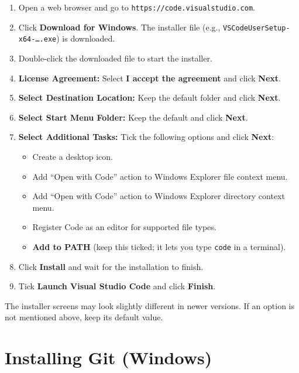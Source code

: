 \documentclass[11pt,a4paper]{article}
\newcommand{\code}[1]{\texttt{#1}}
\newcommand{\menu}[1]{\textsf{\textbf{#1}}}
\begin{document}
\begin{enumerate}
\item Open a web browser and go to \code{https://code.visualstudio.com}.
\item Click \menu{Download for Windows}. The installer file (e.g., \code{VSCodeUserSetup-x64-\ldots.exe}) is downloaded.
\item Double-click the downloaded file to start the installer.
\item \textbf{License Agreement:} Select \menu{I accept the agreement} and click \menu{Next}.
\item \textbf{Select Destination Location:} Keep the default folder and click \menu{Next}.
\item \textbf{Select Start Menu Folder:} Keep the default and click \menu{Next}.
\item \textbf{Select Additional Tasks:} Tick the following options and click \menu{Next}:
  \begin{itemize}
  \item Create a desktop icon.
  \item Add ``Open with Code'' action to Windows Explorer file context menu.
  \item Add ``Open with Code'' action to Windows Explorer directory context menu.
  \item Register Code as an editor for supported file types.
  \item \textbf{Add to PATH} (keep this ticked; it lets you type \code{code} in a terminal).
  \end{itemize}
\item Click \menu{Install} and wait for the installation to finish.
\item Tick \menu{Launch Visual Studio Code} and click \menu{Finish}.
\end{enumerate}

\begin{notebox}
The installer screens may look slightly different in newer versions. If an option is not mentioned above, keep its default value.
\end{notebox}

\section{Installing Git (Windows)}
\end{document}

